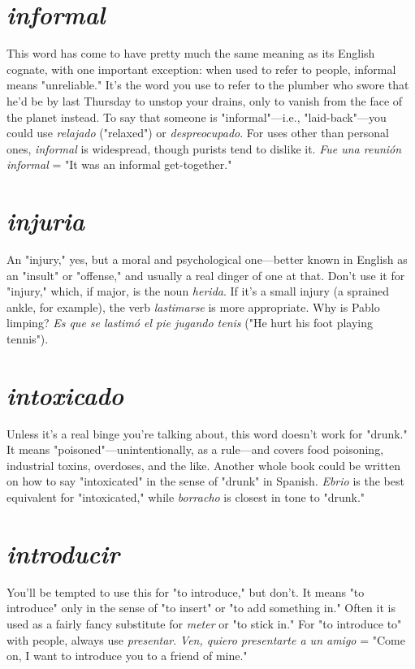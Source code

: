 \documentclass[14pt,a4paper,oneside]{memoir}
\begin{document}
\section{\emph{informal}}

This word has come to have pretty much the
same meaning as its English cognate, with one important exception:
when used to refer to people, informal means "unreliable." It's the
word you use to refer to the plumber who swore that he'd be by last
Thursday to unstop your drains, only to vanish from the face of the
planet instead. To say that someone is "informal"---i.e., "laid-back"---you could use \emph{relajado} ("relaxed") or \emph{despreocupado}. For uses other
than personal ones, \emph{informal} is widespread, though purists tend to dislike it. \emph{Fue una reunión informal} = "It was an informal get-together."

\section{\emph{injuria}}

An "injury," yes, but a moral and psychological
one---better known in English as an "insult" or "offense," and usually
a real dinger of one at that. Don't use it for "injury," which, if major, is
the noun \emph{herida}. If it's a small injury (a sprained ankle, for example),
the verb \emph{lastimarse} is more appropriate. Why is Pablo limping? \emph{Es que
	se lastimó el pie jugando tenis} ("He hurt his foot playing tennis").

\section{\emph{intoxicado}}

Unless it's a real binge you're talking about,
this word doesn't work for "drunk." It means "poisoned"---unintentionally, as a rule---and covers food poisoning, industrial toxins, overdoses, and the like. Another whole book could be written on how to
say "intoxicated" in the sense of "drunk" in Spanish. \emph{Ebrio} is the
best equivalent for "intoxicated," while \emph{borracho} is closest in tone to "drunk."

\section{\emph{introducir}}

You'll be tempted to use this for "to introduce,"
but don't. It means "to introduce" only in the sense of "to insert" or
"to add something in." Often it is used as a fairly fancy substitute for
\emph{meter} or "to stick in." For "to introduce to" with people, always use
\emph{presentar}. \emph{Ven, quiero presentarte a un amigo} = "Come on, I want to
introduce you to a friend of mine."
\end{document}
